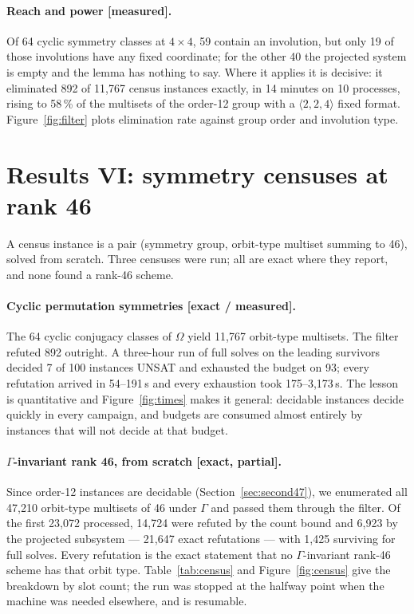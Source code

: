 \documentclass[11pt]{article}
\newcommand{\tw}[3]{\langle #1,#2,#3\rangle}
\begin{document}
\paragraph{Reach and power [measured].} Of 64 cyclic symmetry classes at $4\times4$, 59 contain an
involution, but only 19 of those involutions have any fixed coordinate; for the other 40 the projected
system is empty and the lemma has nothing to say. Where it applies it is decisive: it eliminated 892 of
11{,}767 census instances exactly, in 14 minutes on 10 processes, rising to 58\,\% of the multisets of
the order-12 group with a $\tw224$ fixed format. Figure~\ref{fig:filter} plots elimination rate against
group order and involution type.

\section{Results VI: symmetry censuses at rank 46}
\label{sec:census}

A census instance is a pair (symmetry group, orbit-type multiset summing to 46), solved from scratch. Three
censuses were run; all are exact where they report, and none found a rank-46 scheme.

\paragraph{Cyclic permutation symmetries [exact / measured].} The 64 cyclic conjugacy classes of $\Omega$
yield 11{,}767 orbit-type multisets. The filter refuted 892 outright. A three-hour run of full solves on
the leading survivors decided 7 of 100 instances UNSAT and exhausted the budget on 93; every refutation
arrived in 54--191\,s and every exhaustion took 175--3{,}173\,s. The lesson is quantitative and
Figure~\ref{fig:times} makes it general: decidable instances decide quickly in every campaign, and
budgets are consumed almost entirely by instances that will not decide at that budget.

\paragraph{$\Gamma$-invariant rank 46, from scratch [exact, partial].} Since order-12 instances are
decidable (Section~\ref{sec:second47}), we enumerated all 47{,}210 orbit-type multisets of 46 under
$\Gamma$ and passed them through the filter. Of the first 23{,}072 processed, 14{,}724 were refuted by the
count bound and 6{,}923 by the projected subsystem --- 21{,}647 exact refutations --- with 1{,}425
surviving for full solves. Every refutation is the exact statement that no $\Gamma$-invariant rank-46
scheme has that orbit type. Table~\ref{tab:census} and Figure~\ref{fig:census} give the breakdown by slot
count; the run was stopped at the halfway point when the machine was needed elsewhere, and is resumable.
\end{document}
